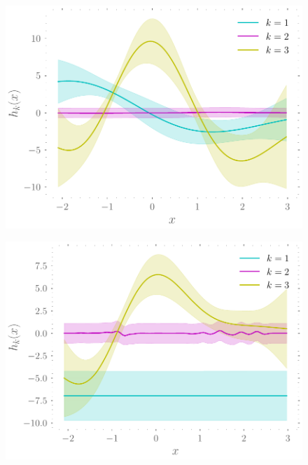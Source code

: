 \documentclass{mimosis-class/mimosis}
\numberwithin{equation}{chapter}
\begin{document}
{\begin{figure}[hbt!]
\begin{minipage}[r]{0.49\textwidth}
\centering
\includegraphics[width=\textwidth]{./images/model/mcycle/K=3_L2/gating_gps.pdf}
\label{fig-gating-gps-mcycle-three-experts-tight}
\end{minipage}
\begin{minipage}[r]{0.49\textwidth}
\centering
\includegraphics[width=\textwidth]{./images/model/mcycle/K=3_L3/gating_gps.pdf}
\label{fig-gating-gps-mcycle-three-experts-further}
\end{minipage}
\begin{minipage}[r]{0.49\textwidth}

\end{minipage}
\end{figure}}
\end{document}
